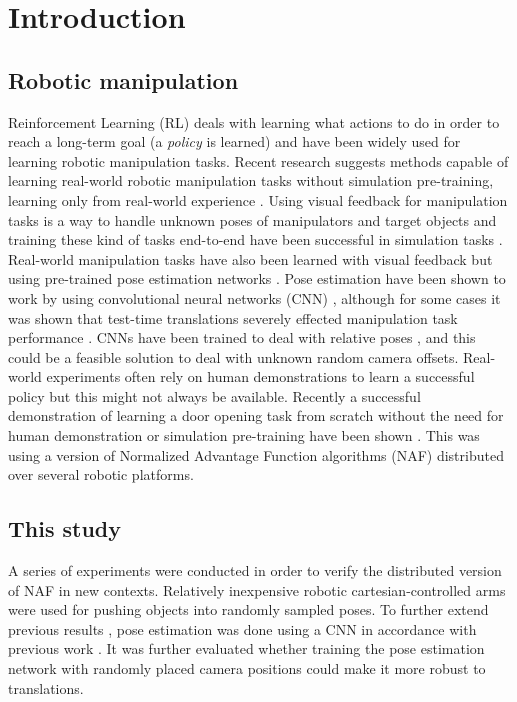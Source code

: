 \section{Introduction}

\subsection{Robotic manipulation}

Reinforcement Learning (RL) deals with learning what actions to do in order to
reach a long-term goal (a \textit{policy} is learned) and have been widely used
for learning robotic manipulation tasks. Recent research suggests methods
capable of learning real-world robotic manipulation tasks without simulation
pre-training, learning only from real-world experience
\cite{yahya2016collective,gu2016deep,finn2016deep,chebotar2016path}. Using
visual feedback for manipulation tasks is a way to handle unknown poses of
manipulators and target objects and training these kind of tasks end-to-end
have been successful in simulation tasks
\cite{schulman2015trust,lillicrap2015continuous}. Real-world manipulation tasks
have also been learned with visual feedback but using pre-trained pose
estimation networks \cite{gu2016deep}. Pose estimation have been shown to work
by using convolutional neural networks (CNN)
\cite{levine2016end,chebotar2016path,yahya2016collective}, although for some
cases it was shown that test-time translations severely effected manipulation
task performance \cite{yahya2016collective}. CNNs have been trained to deal
with relative poses \cite{park20163d}, and this could be a feasible solution to
deal with unknown random camera offsets. Real-world experiments often rely on
human demonstrations to learn a successful policy but this might not always be
available. Recently a successful demonstration of learning a door opening task
from scratch without the need for human demonstration or simulation
pre-training have been shown \cite{gu2016deep}. This was using a version of
Normalized Advantage Function algorithms (NAF) \cite{gu2016continuous}
distributed over several robotic platforms.

\subsection{This study}

A series of experiments were conducted in order to verify the distributed
version of NAF in new contexts. Relatively inexpensive robotic
cartesian-controlled arms were used for pushing objects into randomly sampled
poses. To further extend previous results \cite{gu2016deep}, pose estimation
was done using a CNN in accordance with previous work
\cite{levine2016end,chebotar2016path,yahya2016collective}. It was further
evaluated whether training the pose estimation network with randomly placed
camera positions could make it more robust to translations.

